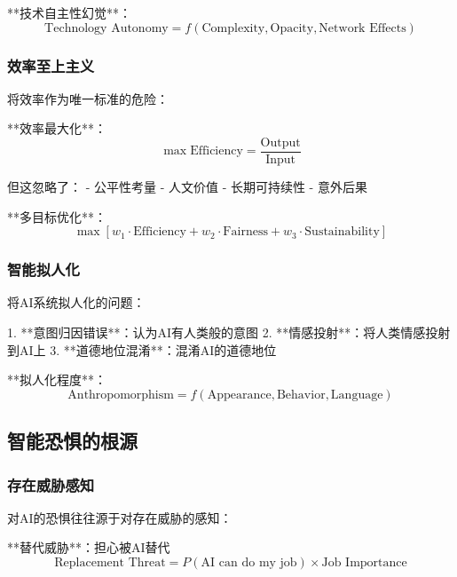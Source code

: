 **技术自主性幻觉**：
\begin{equation}
\text{Technology Autonomy} = f(\text{Complexity}, \text{Opacity}, \text{Network Effects})
\end{equation}

\subsubsection{效率至上主义}

将效率作为唯一标准的危险：

**效率最大化**：
\begin{equation}
\max \text{Efficiency} = \frac{\text{Output}}{\text{Input}}
\end{equation}

但这忽略了：
- 公平性考量
- 人文价值
- 长期可持续性
- 意外后果

**多目标优化**：
\begin{equation}
\max \left[ w_1 \cdot \text{Efficiency} + w_2 \cdot \text{Fairness} + w_3 \cdot \text{Sustainability} \right]
\end{equation}

\subsubsection{智能拟人化}

将AI系统拟人化的问题：

1. **意图归因错误**：认为AI有人类般的意图
2. **情感投射**：将人类情感投射到AI上
3. **道德地位混淆**：混淆AI的道德地位

**拟人化程度**：
\begin{equation}
\text{Anthropomorphism} = f(\text{Appearance}, \text{Behavior}, \text{Language})
\end{equation}

\subsection{智能恐惧的根源}

\subsubsection{存在威胁感知}

对AI的恐惧往往源于对存在威胁的感知：

**替代威胁**：担心被AI替代
\begin{equation}
\text{Replacement Threat} = P(\text{AI can do my job}) \times \text{Job Importance}
\end{equation}


